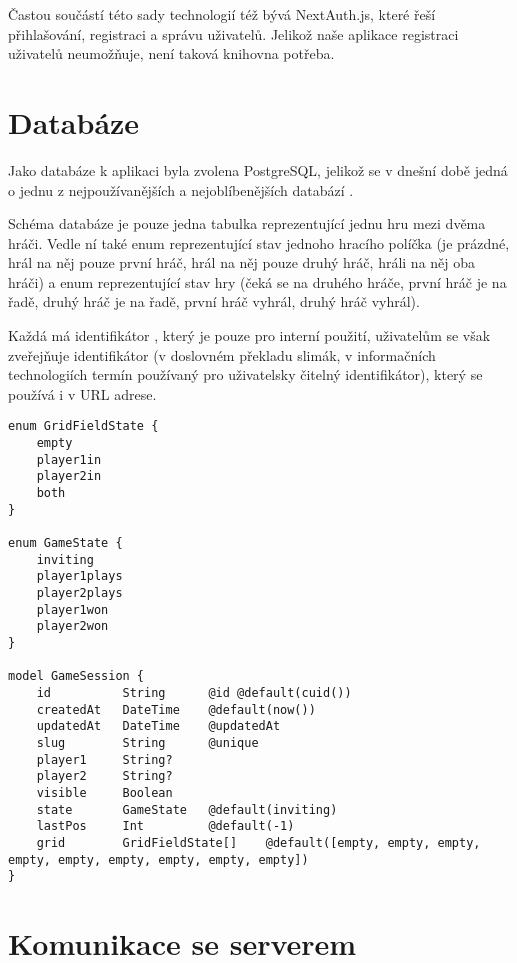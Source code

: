 Častou součástí této sady technologií též bývá NextAuth.js, které řeší přihlašování, registraci a správu uživatelů. Jelikož naše aplikace registraci uživatelů neumožňuje, není taková knihovna potřeba.

\section{Databáze}

Jako databáze k aplikaci byla zvolena PostgreSQL, jelikož se v dnešní době
jedná o jednu z nejpoužívanějších a nejoblíbenějších databází \cite{stackoverflow23}.

Schéma databáze je pouze jedna tabulka  reprezentující jednu hru
mezi dvěma hráči. Vedle ní také enum  reprezentující stav
jednoho hracího políčka (je prázdné, hrál na něj pouze první hráč, hrál na něj
pouze druhý hráč, hráli na něj oba hráči) a enum  reprezentující
stav hry (čeká se na druhého hráče, první hráč je na řadě, druhý hráč je na
řadě, první hráč vyhrál, druhý hráč vyhrál).


Každá  má identifikátor , který je pouze pro interní
použití, uživatelům se však zveřejňuje identifikátor  (v doslovném
překladu slimák, v informačních technologiích termín používaný pro uživatelsky
čitelný identifikátor), který se používá i v URL adrese.\label{par:game-id}

\begin{lstlisting}[language=Prisma,caption={Schéma databáze},label={fig:db-schema}]
enum GridFieldState {
    empty
    player1in
    player2in
    both
}

enum GameState {
    inviting
    player1plays
    player2plays
    player1won
    player2won
}

model GameSession {
    id          String      @id @default(cuid())
    createdAt   DateTime    @default(now())
    updatedAt   DateTime    @updatedAt
    slug        String      @unique
    player1     String?
    player2     String?
    visible     Boolean
    state       GameState   @default(inviting)
    lastPos     Int         @default(-1)
    grid        GridFieldState[]    @default([empty, empty, empty, empty, empty, empty, empty, empty, empty])
}
\end{lstlisting}

\section{Komunikace se serverem}

